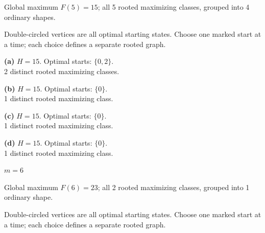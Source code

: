 \documentclass[11pt,a4paper]{article}
\begin{document}
Global maximum $F(5)=15$; all 5 rooted maximizing classes, grouped into 4 ordinary shapes.\par\vspace{2mm}
Double-circled vertices are all optimal starting states. Choose one marked start at a time; each choice defines a separate rooted graph.\par\vspace{3mm}
\begin{minipage}[t]{.48\textwidth}\centering
\resizebox{6.9cm}{!}{}\par
\small\textbf{(a)} $H=15$. Optimal starts: $\{0, 2\}$.\\2 distinct rooted maximizing classes.\par\end{minipage}
\hfill
\begin{minipage}[t]{.48\textwidth}\centering
\resizebox{6.9cm}{!}{}\par
\small\textbf{(b)} $H=15$. Optimal starts: $\{0\}$.\\1 distinct rooted maximizing class.\par\end{minipage}
\par\vspace{5mm}
\begin{minipage}[t]{.48\textwidth}\centering
\resizebox{6.9cm}{!}{}\par
\small\textbf{(c)} $H=15$. Optimal starts: $\{0\}$.\\1 distinct rooted maximizing class.\par\end{minipage}
\hfill
\begin{minipage}[t]{.48\textwidth}\centering
\resizebox{6.9cm}{!}{}\par
\small\textbf{(d)} $H=15$. Optimal starts: $\{0\}$.\\1 distinct rooted maximizing class.\par\end{minipage}
\par\vspace{5mm}
\clearpage
{\LARGE\bfseries $m=6$}\par\vspace{3mm}
Global maximum $F(6)=23$; all 2 rooted maximizing classes, grouped into 1 ordinary shape.\par\vspace{2mm}
Double-circled vertices are all optimal starting states. Choose one marked start at a time; each choice defines a separate rooted graph.\par\vspace{3mm}
\end{document}
